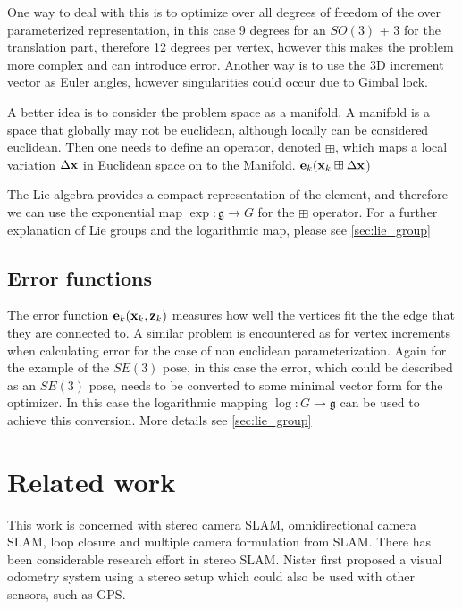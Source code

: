 One way to deal with this is to optimize over all degrees of freedom of the over parameterized representation, in this case 9 degrees for an $SO(3)$ + 3 for the translation part, therefore 12 degrees per vertex, however this makes the problem more complex and can introduce error.  Another way is to use the 3D increment vector as Euler angles, however singularities could occur due to Gimbal lock.

A better idea is to consider the problem space as a manifold.  A manifold is a space that globally may not be euclidean, although locally can be considered euclidean.  Then one needs to define an operator, denoted $\boxplus$, which maps a local variation $\Delta\mathbf x$ in Euclidean space on to the Manifold. $\mathbf e_k(\mathbf x_k \boxplus \Delta\mathbf x$)

The Lie algebra provides a compact representation of the element, and therefore we can use the exponential map $\exp\colon \mathfrak g \to G$ for the $\boxplus$ operator.  For a further explanation of Lie groups and the logarithmic map, please see \ref{sec:lie_group}

\subsection{Error functions}
\label{sec:error_function}
The error function $\mathbf e_k(\mathbf x_k, \mathbf z_k)$ measures how well the vertices fit the the edge that they are connected to.  A similar problem is encountered as for vertex increments when calculating error for the case of non euclidean parameterization.  Again for the example of the $SE(3)$ pose, in this case the error, which could be described as an $SE(3)$ pose, needs to be converted to some minimal vector form for the optimizer.  In this case the  logarithmic mapping $\log\colon G \to \mathfrak g$ can be used to achieve this conversion. More details see \ref{sec:lie_group}


\section{Related work}

This work is concerned with stereo camera SLAM, omnidirectional camera SLAM, loop closure and multiple camera formulation from SLAM.  There has been considerable research effort in stereo SLAM. Nister \cite{nister_04} first proposed a visual odometry system using a stereo setup which could also be used with other sensors, such as GPS.

